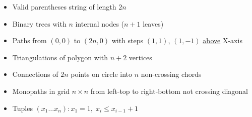 \begin{itemize}
  \item Valid parentheses string of length $2n$
  \item Binary trees with $n$ internal nodes ($n + 1$ leaves)
  \item Paths from $(0, 0)$ to $(2n, 0)$ with steps $(1, 1)$, $(1, -1)$ \ul{above} X-axis
  \item Triangulations of polygon with $n+2$ vertices
  \item Connections of $2n$ points on circle into $n$ non-crossing chords
  \item Monopaths in grid $n\times n$ from left-top to right-bottom not crossing diagonal
  \item Tuples $(x_1 \ldots x_n): x_1 = 1,\; x_i \le x_{i - 1} + 1$
\end{itemize}

